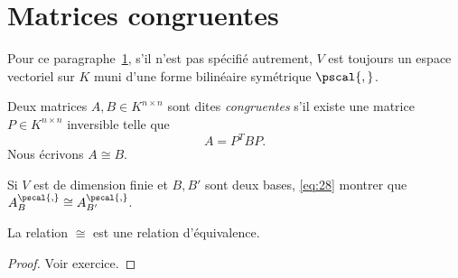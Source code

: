 \section{Matrices congruentes} 
\label{sec:class-des-matr}

\begin{framed}\noindent 
  Pour ce paragraphe~\ref{sec:class-des-matr}, s'il n'est pas spécifié autrement,  $V$
  est toujours un espace vectoriel sur $K$
  muni d'une forme bilinéaire symétrique $\pscal{,}$. 
\end{framed}


\begin{definition}
  \label{def:13}
  Deux matrices $A,B \in K^{n\times n}$ sont dites \emph{congruentes} s'il existe une matrice $P \in K^{n \times n}$ inversible telle que 
\begin{displaymath}
  A = P^T B P.
\end{displaymath}
Nous écrivons $A \cong B$. 
\end{definition}


\begin{example}
  \label{exe:22}
  Si $V$ est de dimension finie et $B,B'$ sont deux bases, \eqref{eq:28} montrer que $A_B^{\pscal{,}} \cong A_{B'}^{\pscal{,}}$. 
\end{example}

\begin{lemma}
  \label{lem:6}
  La relation $\cong$ est une relation d'équivalence. 
\end{lemma}

\begin{proof}
  Voir exercice. 
\end{proof}


